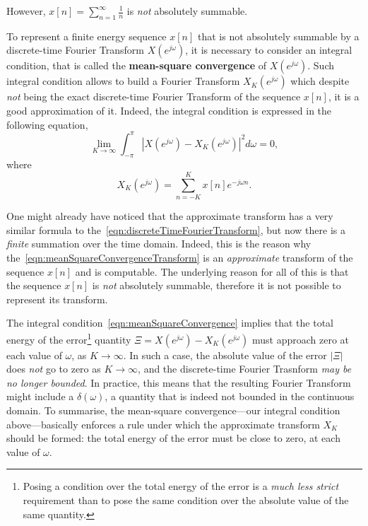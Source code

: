 \documentclass[\documentfontsize, twocolumn]{\classname}
\begin{document}
However, $x[n] = \sum_{n=1}^\infty \frac 1 n$ is \emph{not} absolutely summable.

To represent a finite energy sequence $x[n]$ that is not absolutely summable by a discrete-time Fourier Transform $X(e^{j\omega})$, it is necessary to consider an integral condition, that is called the \textbf{mean-square convergence} of $X(e^{j\omega})$. Such integral condition allows to build a Fourier Transform $X_K(e^{j\omega})$ which despite \emph{not} being the exact discrete-time Fourier Transform of the sequence $x[n]$, it is a good approximation of it. Indeed, the integral condition is expressed in the following equation,
\begin{equation}\label{eqn:meanSquareConvergence}
    \lim_{K\rightarrow \infty}\int_{-\pi}^\pi \left|X(e^{j\omega}) - X_K(e^{j\omega})\right|^2 d\omega = 0,
\end{equation}
where
\begin{equation}\label{eqn:meanSquareConvergenceTransform}
    X_K(e^{j\omega}) = \sum_{n=-K}^K x[n] e^{-j\omega n}.
\end{equation}

One might already have noticed that the approximate transform has a very similar formula to the~\ref{eqn:discreteTimeFourierTransform}, but now there is a \emph{finite} summation over the time domain. Indeed, this is the reason why the~\ref{eqn:meanSquareConvergenceTransform} is an \emph{approximate} transform of the sequence $x[n]$ and is computable. The underlying reason for all of this is that the sequence $x[n]$ is \emph{not} absolutely summable, therefore it is not possible to represent its transform.

The integral condition~\ref{eqn:meanSquareConvergence} implies that the total energy of the error\footnote{Posing a condition over the total energy of the error is a \emph{much less strict} requirement than to pose the same condition over the absolute value of the same quantity.} quantity $\Xi = X(e^{j\omega}) - X_K(e^{j\omega})$ must approach zero at each value of $\omega$, as $K\rightarrow \infty$.  In such a case, the absolute value of the error $|\Xi|$ does \emph{not} go to zero as $K\rightarrow \infty$, and the discrete-time Fourier Trasnform \emph{may be no longer bounded}. In practice, this means that the resulting Fourier Transform might include a $\delta(\omega)$, a quantity that is indeed not bounded in the continuous domain. To summarise, the mean-square convergence---our integral condition above---basically enforces a rule under which the approximate transform $X_K$ should be formed: the total energy of the error must be close to zero, at each value of $\omega$.
\end{document}
